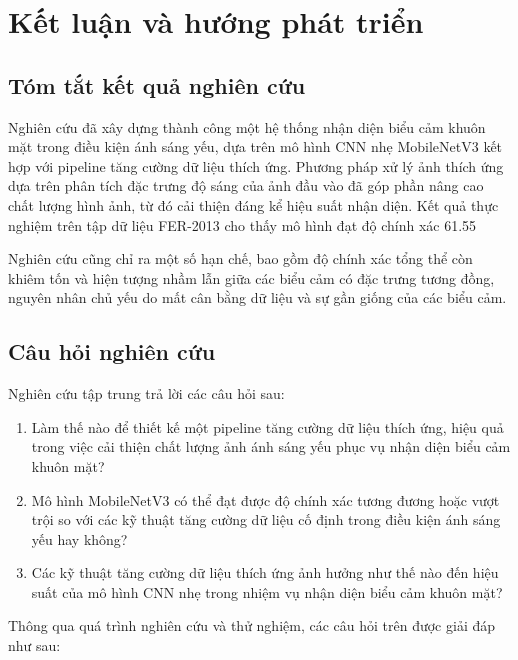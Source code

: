 \section{Kết luận và hướng phát triển}

\subsection{Tóm tắt kết quả nghiên cứu}

Nghiên cứu đã xây dựng thành công một hệ thống nhận diện biểu cảm khuôn mặt trong điều kiện ánh sáng yếu, dựa trên mô hình CNN nhẹ MobileNetV3 kết hợp với pipeline tăng cường dữ liệu thích ứng. Phương pháp xử lý ảnh thích ứng dựa trên phân tích đặc trưng độ sáng của ảnh đầu vào đã góp phần nâng cao chất lượng hình ảnh, từ đó cải thiện đáng kể hiệu suất nhận diện. Kết quả thực nghiệm trên tập dữ liệu FER-2013 cho thấy mô hình đạt độ chính xác 61.55%

Nghiên cứu cũng chỉ ra một số hạn chế, bao gồm độ chính xác tổng thể còn khiêm tốn và hiện tượng nhầm lẫn giữa các biểu cảm có đặc trưng tương đồng, nguyên nhân chủ yếu do mất cân bằng dữ liệu và sự gần giống của các biểu cảm.

\subsection{Câu hỏi nghiên cứu}

Nghiên cứu tập trung trả lời các câu hỏi sau:

\begin{enumerate}
\item Làm thế nào để thiết kế một pipeline tăng cường dữ liệu thích ứng, hiệu quả trong việc cải thiện chất lượng ảnh ánh sáng yếu phục vụ nhận diện biểu cảm khuôn mặt?
\item Mô hình MobileNetV3 có thể đạt được độ chính xác tương đương hoặc vượt trội so với các kỹ thuật tăng cường dữ liệu cố định trong điều kiện ánh sáng yếu hay không?
\item Các kỹ thuật tăng cường dữ liệu thích ứng ảnh hưởng như thế nào đến hiệu suất của mô hình CNN nhẹ trong nhiệm vụ nhận diện biểu cảm khuôn mặt?
\end{enumerate}

Thông qua quá trình nghiên cứu và thử nghiệm, các câu hỏi trên được giải đáp như sau:

